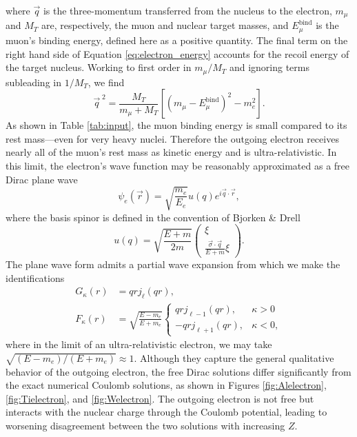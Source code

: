 \documentclass{book}[letterpaper,12pt]
\begin{document}
where $\vec{q}$ is the three-momentum transferred from the nucleus to the electron, $m_{\mu}$ and $M_T$ are, respectively, the muon and nuclear target masses, and $E_{\mu}^\mathrm{bind}$ is the muon's binding energy, defined here as a positive quantity. The final term on the right hand side of Equation \ref{eq:electron_energy} accounts for the recoil energy of the target nucleus. Working to first order in $m_{\mu}/M_T$ and ignoring terms subleading in $1/M_T$, we find
\begin{equation}
\vec{q}^{\;2}=\frac{M_T}{m_{\mu}+M_T}\left[\left(m_{\mu}-E_{\mu}^\mathrm{bind}\right)^2-m_e^2\right].
\end{equation}
As shown in Table \ref{tab:input}, the muon binding energy is small compared to its rest mass---even for very heavy nuclei. Therefore the outgoing electron receives nearly all of the muon's rest mass as kinetic energy and is ultra-relativistic. In this limit, the electron's wave function may be reasonably approximated as a free Dirac plane wave
\begin{equation}
\psi_e(\vec{r})=\sqrt{\frac{m_e}{E_e}}u(q)e^{i\vec{q}\cdot\vec{r}},
\end{equation}
where the basis spinor is defined in the convention of Bjorken \& Drell \cite{Bjorken:1965sts}
\begin{equation}
u(q)=\sqrt{\frac{E+m}{2m}}\left(\begin{array}{c}
\xi\\
\frac{\vec{\sigma}\cdot\vec{q}}{E+m}\xi
\end{array}\right).
\end{equation}
The plane wave form admits a partial wave expansion from which we make the identifications
\begin{equation}
\begin{split}
G_{\kappa}(r)&=qrj_{\ell}(qr),\\
F_{\kappa}(r)&=\sqrt{\frac{E-m_e}{E+m_e}}\left\{\begin{array}{cc}
qrj_{\ell-1}(qr), & \kappa>0\\
-qrj_{\ell+1}(qr), &\kappa < 0,
\end{array}\right.
\end{split}
\end{equation}
where in the limit of an ultra-relativistic electron, we may take $\sqrt{(E-m_e)/(E+m_e)}\approx 1$. Although they capture the general qualitative behavior of the outgoing electron, the free Dirac solutions differ significantly from the exact numerical Coulomb solutions, as shown in Figures \ref{fig:Alelectron}, \ref{fig:Tielectron}, and \ref{fig:Welectron}. The outgoing electron is not free but interacts with the nuclear charge through the Coulomb potential, leading to worsening disagreement between the two solutions with increasing $Z$.
\end{document}

